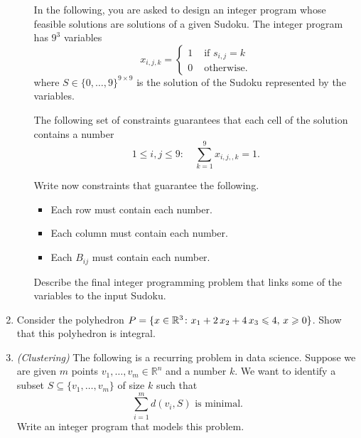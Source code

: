 \begin{enumerate}
\begin{enumerate}[a)]
    \bigskip \noindent

    In the following, you are asked to design an integer program whose feasible solutions are solutions of a given Sudoku. The integer program has $9^3$ variables
    \begin{displaymath}
      x_{i,j,k} =
      \begin{cases}
        1 & \text{ if } s_{i,j} = k \\
        0 & \text{ otherwise.} 
      \end{cases}
    \end{displaymath}
    where $S ∈ \{0,\dots,9\}^{9 ×9}$ is the solution of the Sudoku represented by the variables. 


    The following set of constraints guarantees that each cell of the solution contains a number
    \begin{displaymath}
      1≤i,j≤9: \quad  ∑_{k=1}^9 x_{i,j,,k} = 1. 
    \end{displaymath}

    Write now constraints that guarantee the following.
    \begin{itemize}
    \item Each row must contain each number.
    \item Each column must contain each number.
    \item Each $B_{ij}$ must contain each number. 
    \end{itemize}

    Describe the final integer programming problem that links some of the variables to the input Sudoku. 
    
  \end{enumerate}

  
 \item Consider the polyhedron $P = \{ x \in \mathbb{R}^3 \colon x_1 + 2\,x_2 + 4\,
  x_3 \leqslant 4, \, x\geqslant0\}$. Show that this polyhedron is
  integral. 

\item \emph{(Clustering)} The following is a recurring problem in data science. Suppose we are given $m$ points $v_1,\dots,v_m ∈ ℝ^n$ and a number $k$. We want to identify a subset $S ⊆ \{v_1,\dots,v_m\}$ of size $k$ such that
  \begin{displaymath}
    ∑_{i=1}^m d(v_i, S)  \text{ is minimal.} 
  \end{displaymath}
  Write an integer program that models this problem.

    

  
\end{enumerate}




% 

% 



